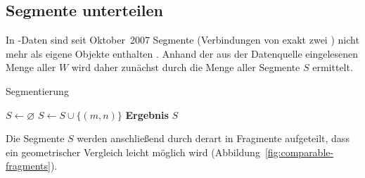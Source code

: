 \documentclass[../main/thesis.tex]{subfiles}
\begin{document}



\subsection{Segmente unterteilen}

In \osm-Daten sind seit Oktober~2007 Segmente (Verbindungen von exakt zwei ) nicht mehr als eigene Objekte enthalten .
Anhand der aus der Datenquelle eingelesenen Menge aller  $W$ wird daher zunächst durch  die Menge aller Segmente $S$ ermittelt.

\begin{algorithm}[H]
\caption{Segmentierung}\label{alg:Segmentierung}
\begin{algorithmic}
	\State $S \gets \varnothing$
			\State $S \gets S \cup \{(m,n)\}$
		\EndFor
	\EndFor
	\State \textbf{Ergebnis} $S$
\EndFunction
\end{algorithmic}
\end{algorithm}

Die Segmente $S$ werden anschließend durch  derart in Fragmente aufgeteilt, dass ein geometrischer Vergleich leicht möglich wird (Abbildung~\ref{fig:comparable-fragments}).
\end{document}
